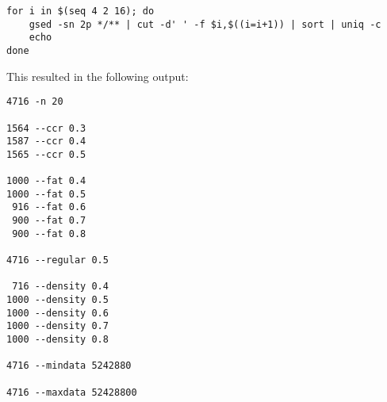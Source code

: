 \begin{verbatim}
for i in $(seq 4 2 16); do
    gsed -sn 2p */** | cut -d' ' -f $i,$((i=i+1)) | sort | uniq -c
    echo
done
\end{verbatim}

This resulted in the following output:

\begin{verbatim}
4716 -n 20

1564 --ccr 0.3
1587 --ccr 0.4
1565 --ccr 0.5

1000 --fat 0.4
1000 --fat 0.5
 916 --fat 0.6
 900 --fat 0.7
 900 --fat 0.8

4716 --regular 0.5

 716 --density 0.4
1000 --density 0.5
1000 --density 0.6
1000 --density 0.7
1000 --density 0.8

4716 --mindata 5242880

4716 --maxdata 52428800
\end{verbatim}
